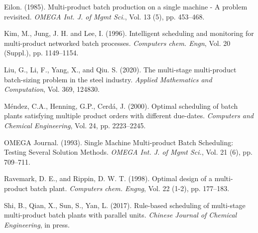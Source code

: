 \documentclass[authoryear,preprint,12pt]{elsarticle}
\begin{document}



\begin{thebibliography}{1}


Eilon. (1985). Multi-product batch production on a single machine - A problem revisited. {\it OMEGA Int. J. of Mgmt Sci.}, Vol. 13 (5), pp. 453--468.

Kim, M., Jung, J. H. and Lee, I. (1996). Intelligent scheduling and monitoring for multi-product networked batch processes. {\it  Computers chem. Engn}, Vol. 20 (Suppl.), pp. 1149--1154.

Liu, G., Li, F., Yang, X., and Qiu. S. (2020). The multi-stage multi-product batch-sizing problem in the steel industry. {\it  Applied Mathematics and Computation}, Vol. 369, 124830.

Méndez, C.A., Henning, G.P., Cerdá, J. (2000). Optimal scheduling of batch plants satisfying multiple product
orders with different due-dates. {\it Computers and Chemical Engineering}, Vol. 24, pp. 2223--2245.

OMEGA Journal. (1993). Single Machine Multi-product Batch Scheduling: Testing Several Solution Methods. {\it  OMEGA Int. J. of Mgmt Sci.}, Vol. 21 (6), pp. 709--711.

Ravemark, D. E., and Rippin, D. W. T. (1998). Optimal design of a multi-product batch plant. {\it Computers chem. Engng}, Vol. 22 (1-2), pp. 177--183.

Shi, B., Qian, X., Sun, S., Yan, L. (2017). Rule-based scheduling of multi-stage multi-product batch plants with parallel units. {\it Chinese Journal of Chemical Engineering}, in press.

\end{thebibliography}
\end{document}
